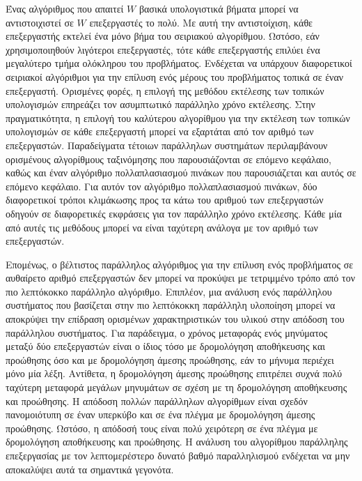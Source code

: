 \documentclass[12pt,a4paper]{article}
\begin{document}
Ένας αλγόριθμος που απαιτεί $W$ βασικά υπολογιστικά βήματα μπορεί να 
αντιστοιχιστεί σε $W$ επεξεργαστές το πολύ. Με αυτή την αντιστοίχιση, 
κάθε επεξεργαστής εκτελεί ένα μόνο βήμα του σειριακού αλγορίθμου. Ωστόσο, 
εάν χρησιμοποιηθούν λιγότεροι επεξεργαστές, τότε κάθε επεξεργαστής επιλύει 
ένα μεγαλύτερο τμήμα ολόκληρου του προβλήματος. Ενδέχεται να υπάρχουν 
διαφορετικοί σειριακοί αλγόριθμοι για την επίλυση ενός μέρους του προβλήματος 
τοπικά σε έναν επεξεργαστή. Ορισμένες φορές, η επιλογή της μεθόδου 
εκτέλεσης των τοπικών υπολογισμών επηρεάζει τον ασυμπτωτικό παράλληλο 
χρόνο εκτέλεσης. Στην πραγματικότητα, η επιλογή του καλύτερου αλγορίθμου 
για την εκτέλεση των τοπικών υπολογισμών σε κάθε επεξεργαστή μπορεί να 
εξαρτάται από τον αριθμό των επεξεργαστών. Παραδείγματα τέτοιων παράλληλων 
συστημάτων περιλαμβάνουν ορισμένους αλγορίθμους ταξινόμησης που παρουσιάζονται 
σε επόμενο κεφάλαιο, καθώς και έναν αλγόριθμο πολλαπλασιασμού πινάκων που 
παρουσιάζεται και αυτός σε επόμενο κεφάλαιο. Για αυτόν τον αλγόριθμο 
πολλαπλασιασμού πινάκων, δύο διαφορετικοί τρόποι κλιμάκωσης προς τα κάτω 
του αριθμού των επεξεργαστών οδηγούν σε διαφορετικές εκφράσεις για τον 
παράλληλο χρόνο εκτέλεσης. Κάθε μία από αυτές τις μεθόδους μπορεί να είναι 
ταχύτερη ανάλογα με τον αριθμό των επεξεργαστών.

Επομένως, ο βέλτιστος παράλληλος αλγόριθμος για την επίλυση ενός προβλήματος 
σε αυθαίρετο αριθμό επεξεργαστών δεν μπορεί να προκύψει με τετριμμένο τρόπο 
από τον πιο λεπτόκοκκο παράλληλο αλγόριθμο. Επιπλέον, μια ανάλυση ενός 
παράλληλου συστήματος που βασίζεται στην πιο λεπτόκοκκη παράλληλη υλοποίηση 
μπορεί να αποκρύψει την επίδραση ορισμένων χαρακτηριστικών του υλικού στην 
απόδοση του παράλληλου συστήματος. Για παράδειγμα, ο χρόνος μεταφοράς ενός 
μηνύματος μεταξύ δύο επεξεργαστών είναι ο ίδιος τόσο με δρομολόγηση 
αποθήκευσης και προώθησης όσο και με δρομολόγηση άμεσης προώθησης, εάν το 
μήνυμα περιέχει μόνο μία λέξη. Αντίθετα, η δρομολόγηση άμεσης προώθησης 
επιτρέπει συχνά πολύ ταχύτερη μεταφορά μεγάλων μηνυμάτων σε σχέση με τη 
δρομολόγηση αποθήκευσης και προώθησης. Η απόδοση πολλών παράλληλων αλγορίθμων 
είναι σχεδόν πανομοιότυπη σε έναν υπερκύβο και σε ένα πλέγμα με δρομολόγηση 
άμεσης προώθησης. Ωστόσο, η απόδοσή τους είναι πολύ χειρότερη σε ένα 
πλέγμα με δρομολόγηση αποθήκευσης και προώθησης. Η ανάλυση του αλγορίθμου 
παράλληλης επεξεργασίας με τον λεπτομερέστερο δυνατό βαθμό παραλληλισμού 
ενδέχεται να μην αποκαλύψει αυτά τα σημαντικά γεγονότα. 
\end{document}
